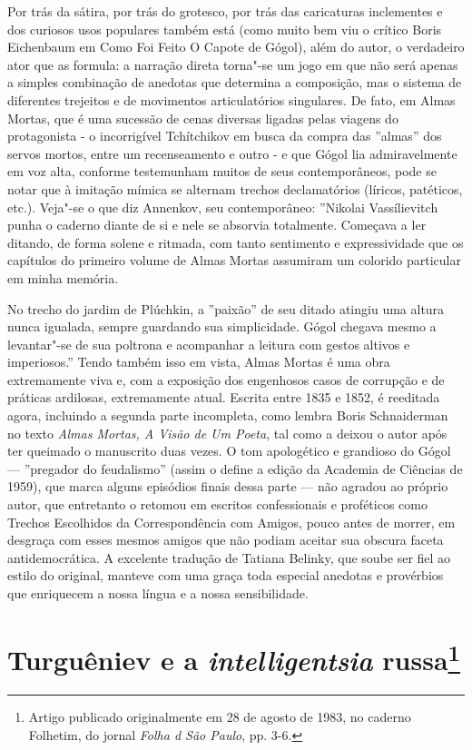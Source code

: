 Por trás da sátira, por trás do grotesco, por trás das caricaturas
inclementes e dos curiosos usos populares também está (como muito bem
viu o crítico Boris Eichenbaum em Como Foi Feito O Capote de Gógol),
além do autor, o verdadeiro ator que as formula: a narração direta
torna"-se um jogo em que não será apenas a simples combinação de anedotas
que determina a composição, mas o sistema de diferentes trejeitos e de
movimentos articulatórios singulares. De fato, em Almas Mortas, que é
uma sucessão de cenas diversas ligadas pelas viagens do protagonista - o
incorrigível Tchítchikov em busca da compra das ''almas'' dos servos
mortos, entre um recenseamento e outro - e que Gógol lia admiravelmente
em voz alta, conforme testemunham muitos de seus contemporâneos, pode se
notar que à imitação mímica se alternam trechos declamatórios (líricos,
patéticos, etc.). Veja"-se o que diz  Annenkov, seu contemporâneo:
''Nikolai Vassílievitch punha o caderno diante de si e nele se absorvia
totalmente. Começava a ler ditando, de forma solene e ritmada, com tanto
sentimento e expressividade que os capítulos do primeiro volume de Almas
Mortas assumiram um colorido particular em minha memória.

No trecho do jardim de Plúchkin, a ''paixão'' de seu ditado atingiu uma
altura nunca igualada, sempre guardando sua simplicidade. Gógol chegava
mesmo a levantar"-se de sua poltrona e acompanhar a leitura com gestos
altivos e imperiosos.'' Tendo também isso em vista, Almas Mortas é uma
obra extremamente viva e, com a exposição dos engenhosos casos de
corrupção e de práticas ardilosas, extremamente atual. Escrita entre
1835 e 1852, é reeditada agora, incluindo a segunda parte incompleta,
como lembra Boris Schnaiderman no texto \emph{Almas Mortas, A Visão de Um
Poeta}, tal como a deixou o autor após ter queimado o manuscrito duas
vezes. O tom apologético e grandioso do Gógol --- ''pregador do
feudalismo'' (assim o define a edição da Academia de Ciências de 1959),
que marca alguns episódios finais dessa parte --- não agradou ao próprio
autor, que entretanto o retomou em escritos confessionais e proféticos
como Trechos Escolhidos da Correspondência com Amigos, pouco antes de
morrer, em desgraça com esses mesmos amigos que não podiam aceitar sua
obscura faceta antidemocrática. A excelente tradução de Tatiana Belinky,
que soube ser fiel ao estilo do original, manteve com uma graça toda
especial anedotas e provérbios que enriquecem a nossa língua e a nossa
sensibilidade.

\chapter{Turguêniev e a \emph{intelligentsia} russa\footnote{Artigo
  publicado originalmente em 28 de agosto de 1983, no caderno Folhetim,
  do jornal \emph{Folha d São Paulo}, pp. 3-6.}}

